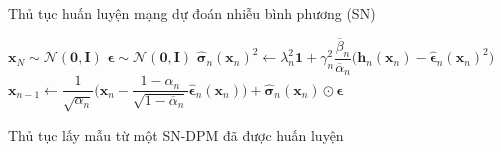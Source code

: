 \documentclass[14pt, a4paper]{article}
\numberwithin{equation}{section}
\numberwithin{figure}{section}
\numberwithin{dl}{section}
\numberwithin{md}{section}
\numberwithin{bd}{section}
\numberwithin{dn}{section}
\numberwithin{hq}{section}
\begin{document}
    \begin{algorithm}[h!]
        \DontPrintSemicolon
        \caption{Thủ tục huấn luyện mạng dự đoán nhiễu bình phương (SN)}
        \label{alg:Learning-of-the-SN-prediction-network}
    \end{algorithm}

    \begin{algorithm}[h!]
        \DontPrintSemicolon
        $\boldsymbol{x}_N \sim \mathcal{N} (\boldsymbol{0}, \boldsymbol{I})$\;
         {
             {
                $\boldsymbol{\epsilon} \sim \mathcal{N}(\boldsymbol{0}, \boldsymbol{I})$\;
            } 
            $\hat{\boldsymbol{\sigma}}_n (\boldsymbol{x}_n)^2 \gets \lambda_n^2 \boldsymbol{1} + \gamma_n^2 \dfrac{\overline{\beta}_n}{\overline{\alpha}_n} \big( \boldsymbol{h}_n (\boldsymbol{x}_n) - \hat{\boldsymbol{\epsilon}}_n (\boldsymbol{x}_n)^2 \big)$\;
        $\boldsymbol{x}_{n-1} \gets \dfrac{1}{\sqrt{\alpha_n}} \Big( \boldsymbol{x}_n - \dfrac{1 - \alpha_n}{\sqrt{1 - \overline{\alpha}_n}} \hat{\boldsymbol{\epsilon}}_n (\boldsymbol{x}_n) \Big) + \hat{\boldsymbol{\sigma}}_n (\boldsymbol{x}_n) \odot \boldsymbol{\epsilon}$\;
        }
        \;
        \caption{Thủ tục lấy mẫu từ một SN-DPM đã được huấn luyện}
        \label{alg:Sampling-of-SN}
    \end{algorithm}
\end{document}
